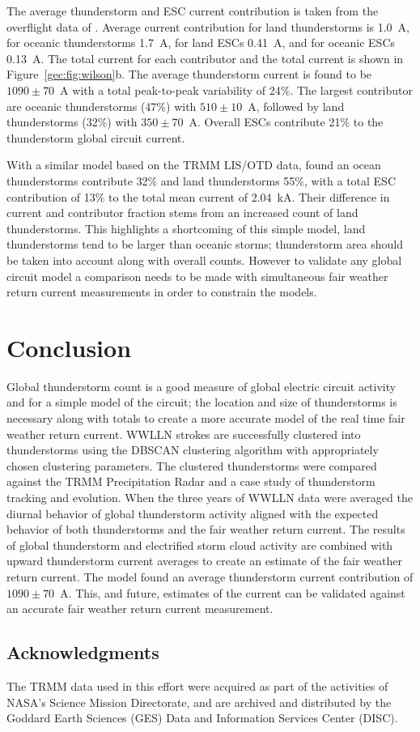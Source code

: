 The average thunderstorm and ESC current contribution is taken from the overflight data of \citet{Mach2010}.
Average current contribution for land thunderstorms is 1.0~A, for oceanic thunderstorms 1.7~A, for land ESCs 0.41~A, and for oceanic ESCs 0.13~A.
The total current for each contributor and the total current is shown in Figure~\ref{gec:fig:wilson}b.
The average thunderstorm current is found to be $1090 \pm 70$~A with a total peak-to-peak variability of 24\%.
The largest contributor are oceanic thunderstorms (47\%) with $510 \pm 10$~A, followed by land thunderstorms (32\%) with $350 \pm 70$~A.
Overall ESCs contribute 21\% to the thunderstorm global circuit current.

With a similar model based on the TRMM LIS/OTD data, \citet{Mach2011} found an ocean thunderstorms contribute 32\% and land thunderstorms 55\%, with a total ESC contribution of 13\% to the total mean current of 2.04~kA.
Their difference in current and contributor fraction stems from an increased count of land thunderstorms.
This highlights a shortcoming of this simple model, land thunderstorms tend to be larger than oceanic storms; thunderstorm area should be taken into account along with overall counts.
However to validate any global circuit model a comparison needs to be made with simultaneous fair weather return current measurements in order to constrain the models.

\section{Conclusion}

Global thunderstorm count is a good measure of global electric circuit activity and for a simple model of the circuit; the location and size of thunderstorms is necessary along with totals to create a more accurate model of the real time fair weather return current.
WWLLN strokes are successfully clustered into thunderstorms using the DBSCAN clustering algorithm with appropriately chosen clustering parameters.
The clustered thunderstorms were compared against the TRMM Precipitation Radar and a case study of thunderstorm tracking and evolution.
When the three years of WWLLN data were averaged the diurnal behavior of global thunderstorm activity aligned with the expected behavior of both thunderstorms and the fair weather return current.
The results of global thunderstorm and electrified storm cloud activity are combined with upward thunderstorm current averages to create an estimate of the fair weather return current.
The model found an average thunderstorm current contribution of $1090 \pm 70$~A.
This, and future, estimates of the current can be validated against an accurate fair weather return current measurement.

\subsection*{Acknowledgments}
The TRMM data used in this effort were acquired as part of the activities of NASA's Science Mission Directorate, and are archived and distributed by the Goddard Earth Sciences (GES) Data and Information Services Center (DISC).
